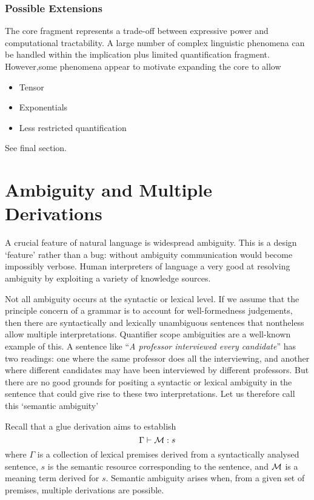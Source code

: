 \subsubsection{Possible Extensions}

The core fragment represents a trade-off between expressive power and
computational tractability. A large number of complex linguistic
phenomena can be handled within the implication plus limited
quantification fragment.  However,some phenomena appear to
motivate expanding the core to allow
\begin{itemize}
\item Tensor
\item Exponentials
\item Less restricted quantification
\end{itemize}
See final section.




\section{Ambiguity and Multiple Derivations}

A crucial feature of natural language is widespread ambiguity.
This is a design `feature' rather than a bug: without ambiguity
communication would become impossibly verbose.  Human interpreters
of language a very good at resolving ambiguity by exploiting
a variety of knowledge sources.

Not all ambiguity occurs at the syntactic or lexical level.
If we assume that the principle concern of a grammar is to account
for well-formedness judgements, then there are syntactically
and lexically unambiguous sentences that nontheless allow multiple
interpretations.  Quantifier scope ambiguities are a well-known
example of this.  A sentence like ``{\it A professor interviewed
every candidate}'' has two readings: one where the same professor
does all the interviewing, and another where different candidates may
have been interviewed by different professors.  But there are no good
grounds for positing a syntactic or lexical ambiguity in the sentence
that could give rise to these two interpretations.  Let us therefore
call this `semantic ambiguity'

Recall that a glue derivation aims to establish
\[\Gamma \vdash {\cal M}:s\]
where $\Gamma$ is a collection of lexical premises derived from a
syntactically analysed sentence, $s$ is the semantic resource
corresponding to the sentence, and $\cal M$ is a meaning term derived
for $s$.  Semantic ambiguity arises when, from a given set of
premises, multiple derivations are possible.

